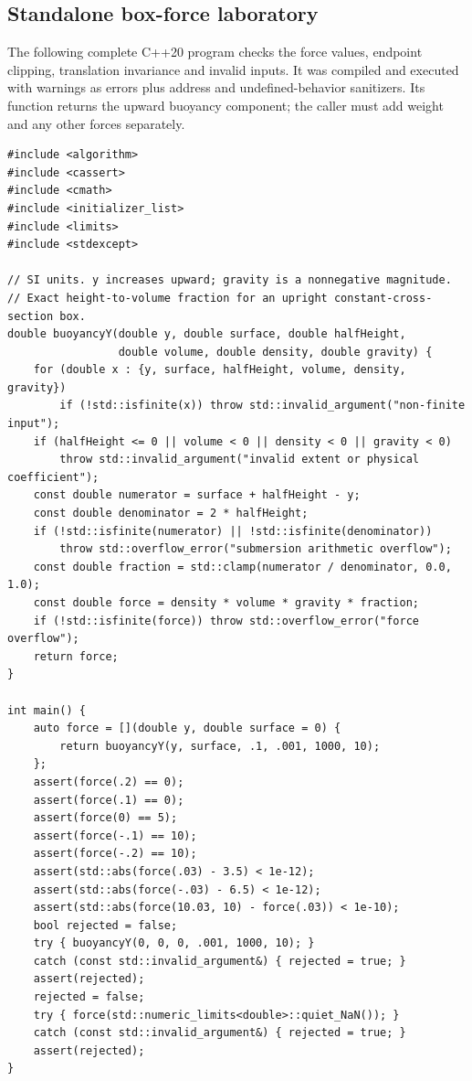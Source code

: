 \subsection{Standalone box-force laboratory}\label{06-engine-ii-ch047-standalone-box-force-laboratory}

\hypertarget{06-engine-ii-ch047-standalone-box-force-laboratory}{}

The following complete C++20 program checks the force values, endpoint clipping, translation invariance and invalid inputs. It was compiled and executed with warnings as errors plus address and undefined-behavior sanitizers. Its function returns the upward buoyancy component; the caller must add weight and any other forces separately.

\begin{verbatim}
#include <algorithm>
#include <cassert>
#include <cmath>
#include <initializer_list>
#include <limits>
#include <stdexcept>

// SI units. y increases upward; gravity is a nonnegative magnitude.
// Exact height-to-volume fraction for an upright constant-cross-section box.
double buoyancyY(double y, double surface, double halfHeight,
                 double volume, double density, double gravity) {
    for (double x : {y, surface, halfHeight, volume, density, gravity})
        if (!std::isfinite(x)) throw std::invalid_argument("non-finite input");
    if (halfHeight <= 0 || volume < 0 || density < 0 || gravity < 0)
        throw std::invalid_argument("invalid extent or physical coefficient");
    const double numerator = surface + halfHeight - y;
    const double denominator = 2 * halfHeight;
    if (!std::isfinite(numerator) || !std::isfinite(denominator))
        throw std::overflow_error("submersion arithmetic overflow");
    const double fraction = std::clamp(numerator / denominator, 0.0, 1.0);
    const double force = density * volume * gravity * fraction;
    if (!std::isfinite(force)) throw std::overflow_error("force overflow");
    return force;
}

int main() {
    auto force = [](double y, double surface = 0) {
        return buoyancyY(y, surface, .1, .001, 1000, 10);
    };
    assert(force(.2) == 0);
    assert(force(.1) == 0);
    assert(force(0) == 5);
    assert(force(-.1) == 10);
    assert(force(-.2) == 10);
    assert(std::abs(force(.03) - 3.5) < 1e-12);
    assert(std::abs(force(-.03) - 6.5) < 1e-12);
    assert(std::abs(force(10.03, 10) - force(.03)) < 1e-10);
    bool rejected = false;
    try { buoyancyY(0, 0, 0, .001, 1000, 10); }
    catch (const std::invalid_argument&) { rejected = true; }
    assert(rejected);
    rejected = false;
    try { force(std::numeric_limits<double>::quiet_NaN()); }
    catch (const std::invalid_argument&) { rejected = true; }
    assert(rejected);
}
\end{verbatim}

